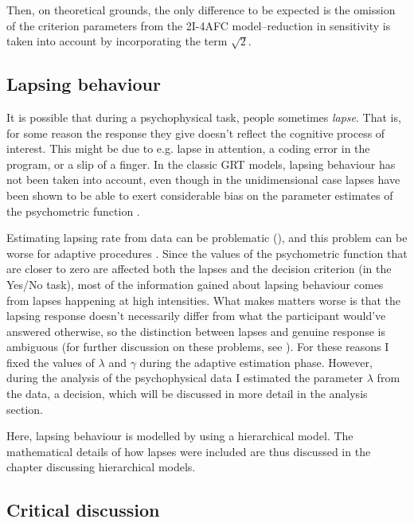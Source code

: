 \documentclass{article}\usepackage{knitr}
\begin{document}
Then, on theoretical grounds, the only difference to be expected is the omission of the criterion parameters from the 2I-4AFC model--reduction in sensitivity is taken into account by incorporating the term $\sqrt{2}$. 

\subsection{Lapsing behaviour}
\label{sec:lapses_general}

It is possible that during a psychophysical task, people sometimes \textit{lapse}. That is, for some reason the response they give doesn't reflect the cognitive process of interest. This might be due to e.g. lapse in attention, a coding error in the program, or a slip of a finger. In the classic GRT models, lapsing behaviour has not been taken into account, even though in the unidimensional case lapses have been shown to be able to exert considerable bias on the parameter estimates of the psychometric function \citep{wichmannhill2001}. 

Estimating lapsing rate from data can be problematic (\cite{wichmannhill2001, treutwein1999}), and this problem can be worse for adaptive procedures \citep{prins2012}. Since the values of the psychometric function that are closer to zero are affected both the lapses and the decision criterion (in the Yes/No task), most of the information gained about lapsing behaviour comes from lapses happening at high intensities. What makes matters worse is that the lapsing response doesn't necessarily differ from what the participant would've answered otherwise, so the distinction between lapses and genuine response is ambiguous (for further discussion on these problems, see \cite{prins2012}). For these reasons I fixed the values of $\lambda$ and $\gamma$ during the adaptive estimation phase. However, during the analysis of the psychophysical data I estimated the parameter $\lambda$ from the data, a decision, which will be discussed in more detail in the analysis section.

Here, lapsing behaviour is modelled by using a hierarchical model. The mathematical details of how lapses were included are thus discussed in the chapter discussing hierarchical models. 



\subsection{Critical discussion}
\label{sec:grt_criticism}
\end{document}
